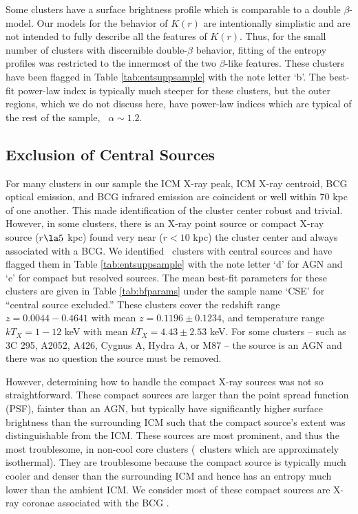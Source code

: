 Some clusters have a surface brightness profile which is comparable to
a double $\beta$-model. Our models for the behavior of $K(r)$ are
intentionally simplistic and are not intended to fully describe all
the features of $K(r)$. Thus, for the small number of clusters with
discernible double-$\beta$ behavior, fitting of the entropy profiles
was restricted to the innermost of the two $\beta$-like
features. These clusters have been flagged in Table
\ref{tab:entsuppsample} with the note letter `b'. The best-fit
power-law index is typically much steeper for these clusters, but the
outer regions, which we do not discuss here, have power-law indices
which are typical of the rest of the sample, \ie\ $\alpha \sim 1.2$.


\subsection{Exclusion of Central Sources}
\label{sec:entsuppcentsrc}

For many clusters in our sample the ICM X-ray peak, ICM X-ray
centroid, BCG optical emission, and BCG infrared emission are
coincident or well within 70 kpc of one another. This made
identification of the cluster center robust and trivial. However, in
some clusters, there is an X-ray point source or compact X-ray source
($r \la 5$ kpc) found very near ($r < 10$ kpc) the cluster center and
always associated with a BCG. We identified \centsrcnum\ clusters with
central sources and have flagged them in Table \ref{tab:entsuppsample}
with the note letter `d' for AGN and `e' for compact but resolved
sources. The mean best-fit parameters for these clusters are given in
Table \ref{tab:bfparams} under the sample name `CSE' for ``central
source excluded.'' These clusters cover the redshift range $z =
0.0044-0.4641$ with mean $z = 0.1196 \pm 0.1234$, and temperature
range $kT_X = 1-12$ keV with mean $kT_X = 4.43 \pm 2.53$ keV. For some
clusters -- such as 3C 295, A2052, A426, Cygnus A, Hydra A, or M87 --
the source is an AGN and there was no question the source must be
removed.

However, determining how to handle the compact X-ray sources was not
so straightforward. These compact sources are larger than the point
spread function (PSF), fainter than an AGN, but typically have
significantly higher surface brightness than the surrounding ICM such
that the compact source's extent was distinguishable from the
ICM. These sources are most prominent, and thus the most troublesome,
in non-cool core clusters (\ie\ clusters which are approximately
isothermal). They are troublesome because the compact source is
typically much cooler and denser than the surrounding ICM and hence
has an entropy much lower than the ambient ICM. We consider most of
these compact sources are X-ray coronae associated with the BCG
\citep{coronae}.

